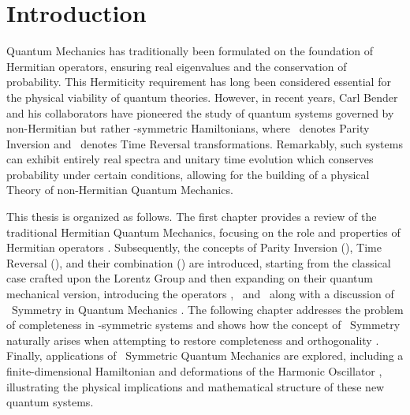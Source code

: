 \chapter{Introduction}\label{ch:introduction}
    Quantum Mechanics has traditionally been formulated on the foundation of Hermitian operators, ensuring real eigenvalues and the conservation of probability. This Hermiticity requirement has long been considered essential for the physical viability of quantum theories. However, in recent years, Carl Bender and his collaborators have pioneered the study of quantum systems governed by non-Hermitian but rather \PT-symmetric Hamiltonians, where \mcP\ denotes Parity Inversion and \mcT\ denotes Time Reversal transformations. Remarkably, such systems can exhibit entirely real spectra and unitary time evolution which conserves probability under certain conditions, allowing for the building of a physical Theory of non-Hermitian Quantum Mechanics.

    This thesis is organized as follows. The first chapter provides a review of the traditional Hermitian Quantum Mechanics, focusing on the role and properties of Hermitian operators \cite{Shankar2012-kg,Sakurai2020-pu,Bernardini1993-iy}. Subsequently, the concepts of Parity Inversion (\mcP), Time Reversal (\mcT), and their combination (\PT) are introduced, starting from the classical case crafted upon the Lorentz Group \cite{bender2024} and then expanding on their quantum mechanical version, introducing the operators \hP, \hT\ and \hPT\ along with a discussion of \PT\ Symmetry in Quantum Mechanics \cite{Bender2005,bender2024}. The following chapter addresses the problem of completeness in \PT-symmetric systems and shows how the concept of \CPT\ Symmetry naturally arises when attempting to restore completeness and orthogonality \cite{Bender2007,bender2024,Weigert2003}. Finally, applications of \PT\ Symmetric Quantum Mechanics are explored, including a finite-dimensional Hamiltonian and deformations of the Harmonic Oscillator \cite{Bender1998}, illustrating the physical implications and mathematical structure of these new quantum systems.